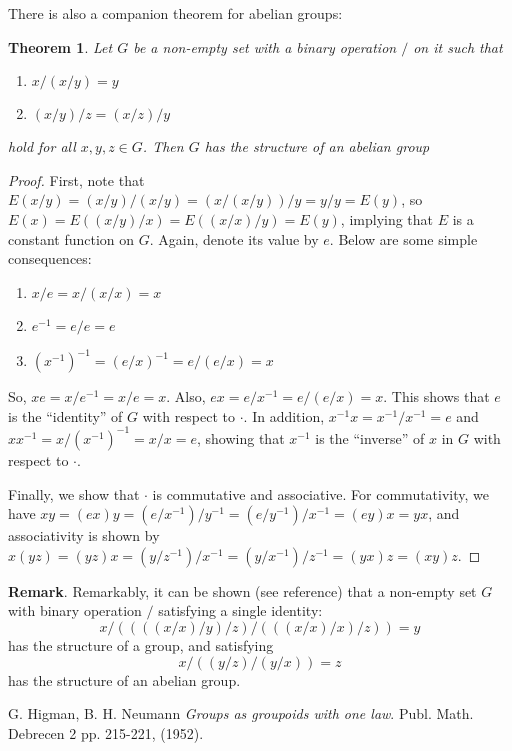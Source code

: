 \documentclass[12pt]{article}
\newtheorem{thm}{Theorem}
\begin{document}
There is also a companion theorem for abelian groups:

\begin{thm}  Let $G$ be a non-empty set with a binary operation $/$ on it such that
\begin{enumerate}
\item $x/(x/y)=y$
\item $(x/y)/z=(x/z)/y$
\end{enumerate}
hold for all $x,y,z\in G$.  Then $G$ has the structure of an abelian group
\end{thm}
\begin{proof}  First, note that $E(x/y)=(x/y)/(x/y)=(x/(x/y))/y=y/y=E(y)$, so $E(x)=E((x/y)/x)=E((x/x)/y)=E(y)$, implying that $E$ is a constant function on $G$.  Again, denote its value by $e$.  Below are some simple consequences:
\begin{enumerate}
\item $x/e=x/(x/x)=x$
\item $e^{-1}=e/e=e$
\item $(x^{-1})^{-1}=(e/x)^{-1}=e/(e/x)=x$
\end{enumerate}
So, $xe=x/e^{-1}=x/e=x$.  Also, $ex=e/x^{-1}=e/(e/x)=x$.  This shows that $e$ is the ``identity'' of $G$ with respect to $\cdot$.  In addition, $x^{-1}x=x^{-1}/x^{-1}=e$ and $xx^{-1}=x/(x^{-1})^{-1}=x/x=e$, showing that $x^{-1}$ is the ``inverse'' of $x$ in $G$ with respect to $\cdot$.

Finally, we show that $\cdot$ is commutative and associative.  For commutativity, we have $xy=(ex)y=(e/x^{-1})/y^{-1}=(e/y^{-1})/x^{-1}=(ey)x=yx$, and associativity is shown by $x(yz)=(yz)x=(y/z^{-1})/x^{-1}=(y/x^{-1})/z^{-1}=(yx)z=(xy)z$.
\end{proof}

\textbf{Remark}.  Remarkably, it can be shown (see reference) that a non-empty set $G$ with binary operation $/$ satisfying a single identity: $$x/((((x/x)/y)/z)/(((x/x)/x)/z))=y$$ has the structure of a group, and satisfying $$x/((y/z)/(y/x))=z$$ has the structure of an abelian group.

\begin{thebibliography}{7}
 G. Higman, B. H. Neumann {\em Groups as groupoids with one law}.  Publ. Math. Debrecen 2 pp. 215-221, (1952).
\end{thebibliography}
\end{document}
